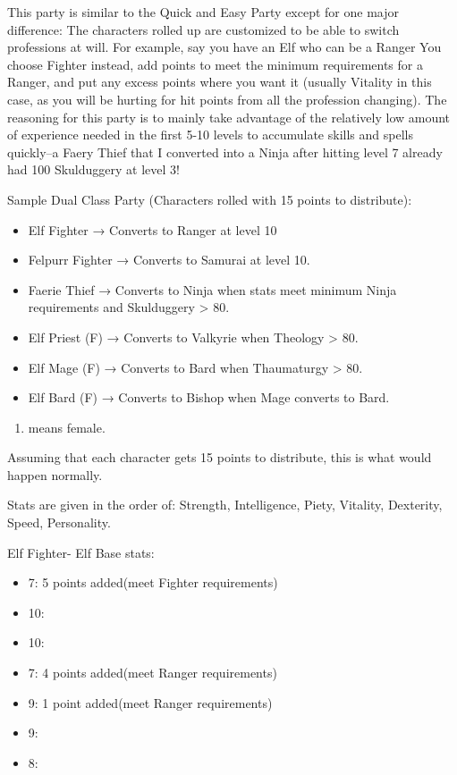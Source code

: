 \documentclass[12pt]{article}
\providecommand{\tightlist}{%
  \setlength{\itemsep}{0pt}\setlength{\parskip}{0pt}}
\begin{document}
This party is similar to the Quick and Easy Party except for one major
difference: The characters rolled up are customized to be able to switch
professions at will. For example, say you have an Elf who can be a
Ranger You choose Fighter instead, add points to meet the minimum
requirements for a Ranger, and put any excess points where you want it
(usually Vitality in this case, as you will be hurting for hit points
from all the profession changing). The reasoning for this party is to
mainly take advantage of the relatively low amount of experience needed
in the first 5-10 levels to accumulate skills and spells quickly--a
Faery Thief that I converted into a Ninja after hitting level 7 already
had 100 Skulduggery at level 3!

Sample Dual Class Party (Characters rolled with 15 points to distribute):

\begin{itemize}
\tightlist
\item
  Elf Fighter → Converts to Ranger at level 10
\item
  Felpurr Fighter → Converts to Samurai at level 10.
\item
  Faerie Thief → Converts to Ninja when stats meet minimum Ninja
  requirements and Skulduggery \textgreater{} 80.
\item
  Elf Priest (F) → Converts to Valkyrie when Theology \textgreater{} 80.
\item
  Elf Mage (F) → Converts to Bard when Thaumaturgy \textgreater{} 80.
\item
  Elf Bard (F) → Converts to Bishop when Mage converts to Bard.
\end{itemize}

\begin{enumerate}
\def\labelenumi{(\Alph{enumi})}
\setcounter{enumi}{5}
\tightlist
\item
  means female.
\end{enumerate}

Assuming that each character gets 15 points to distribute, this is what
would happen normally.

Stats are given in the order of: Strength, Intelligence, Piety,
Vitality, Dexterity, Speed, Personality.

Elf Fighter- Elf Base stats:

\begin{itemize}
\tightlist
\item
  7: 5 points added(meet Fighter requirements)
\item
  10:
\item
  10:
\item
  7: 4 points added(meet Ranger requirements)
\item
  9: 1 point added(meet Ranger requirements)
\item
  9:
\item
  8:
\end{itemize}
\end{document}
